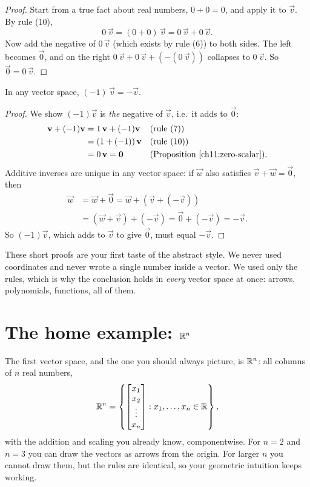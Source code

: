\begin{proof}
Start from a true fact about real numbers, $0 + 0 = 0$, and apply it to $\vec{v}$. By
rule (10),
\[
0\,\vec{v} = (0+0)\,\vec{v} = 0\,\vec{v} + 0\,\vec{v}.
\]
Now add the negative of $0\,\vec{v}$ (which exists by rule (6)) to both sides. The left
becomes $\vec{0}$, and on the right $0\,\vec{v} + 0\,\vec{v} + (-(0\,\vec{v}))$ collapses
to $0\,\vec{v}$. So $\vec{0} = 0\,\vec{v}$.
\end{proof}

\begin{proposition}\label{ch11:neg-one}
In any vector space, $(-1)\,\vec{v} = -\vec{v}$.
\end{proposition}

\begin{proof}
We show $(-1)\vec{v}$ is \emph{the} negative of $\vec{v}$, i.e.\ it adds to $\vec{0}$:
\begin{align*}
\vec{v} + (-1)\vec{v} &= 1\,\vec{v} + (-1)\vec{v} && \text{(rule (7))}\\
&= (1 + (-1))\,\vec{v} && \text{(rule (10))}\\
&= 0\,\vec{v} = \vec{0} && \text{(Proposition~\ref{ch11:zero-scalar})}.
\end{align*}
Additive inverses are unique in any vector space: if $\vec{w}$ also satisfies
$\vec{v}+\vec{w}=\vec{0}$, then
\begin{align*}
\vec{w} &= \vec{w} + \vec{0} = \vec{w} + (\vec{v} + (-\vec{v}))\\
&= (\vec{w}+\vec{v}) + (-\vec{v}) = \vec{0} + (-\vec{v}) = -\vec{v}.
\end{align*}
So $(-1)\vec{v}$, which adds to $\vec{v}$ to give $\vec{0}$, must equal $-\vec{v}$.
\end{proof}

\begin{intuitionbox}
These short proofs are your first taste of the abstract style. We never used coordinates
and never wrote a single number inside a vector. We used only the rules, which is why
the conclusion holds in \emph{every} vector space at once: arrows, polynomials,
functions, all of them.
\end{intuitionbox}

\section{The home example: $\R^n$}

The first vector space, and the one you should always picture, is $\R^n$: all columns of
$n$ real numbers,
\[
\R^n = \left\{ \colvec{x_1\\x_2\\\vdots\\x_n} : x_1,\dots,x_n \in \R \right\},
\]
with the addition and scaling you already know, componentwise. For $n=2$ and $n=3$ you
can draw the vectors as arrows from the origin. For larger $n$ you cannot draw
them, but the rules are identical, so your geometric intuition keeps working.

